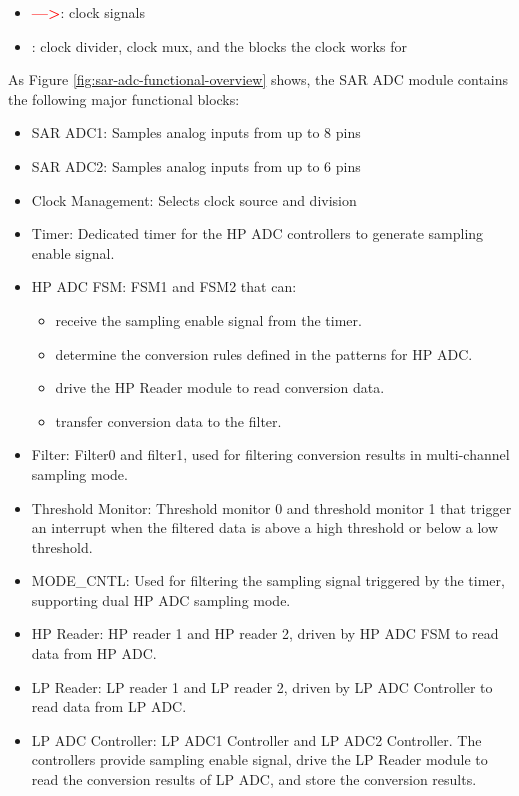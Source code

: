 \documentclass[main\_\_EN.tex]{subfiles}
\begin{document}
\vspace{-2em}
\begin{itemize}
    \item \textcolor{red}{\textbf{--->}}: clock signals
    \item
: clock divider, clock mux, and the blocks the clock works for
\end{itemize}

As Figure \ref{fig:sar-adc-functional-overview} shows, the SAR ADC module contains the following major functional blocks:

\begin{itemize}
    \item SAR ADC1: Samples analog inputs from up to 8 pins
    \item SAR ADC2: Samples analog inputs from up to 6 pins
    \item Clock Management: Selects clock source and division
    \item Timer: Dedicated timer for the HP ADC controllers to generate sampling enable signal.
    \item HP ADC FSM: FSM1 and FSM2 that can:
        \begin{itemize}
            \item receive the sampling enable signal from the timer.
            \item determine the conversion rules defined in the patterns for HP ADC.
            \item drive the HP Reader module to read conversion data.
            \item transfer conversion data to the filter.
        \end{itemize}
    \item Filter: Filter0 and filter1, used for filtering conversion results in multi-channel sampling mode.
    \item Threshold Monitor: Threshold monitor 0 and threshold monitor 1 that trigger an interrupt when the filtered data is above a high threshold or below a low threshold.
    \item MODE\_CNTL: Used for filtering the sampling signal triggered by the timer, supporting dual HP ADC sampling mode.
    \item HP Reader: HP reader 1 and HP reader 2, driven by HP ADC FSM to read data from HP ADC.
    \item LP Reader: LP reader 1 and LP reader 2, driven by LP ADC Controller to read data from LP ADC.
    \item LP ADC Controller: LP ADC1 Controller and LP ADC2 Controller. The controllers provide sampling enable signal, drive the LP Reader module to read the conversion results of LP ADC, and store the conversion results.
\end{itemize}
\end{document}
